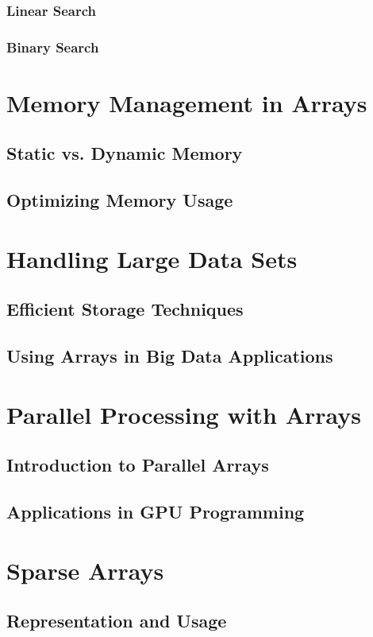 \documentclass[12pt, oneside]{book}
\begin{document}
	\subsubsection{Linear Search}
	\subsubsection{Binary Search}
	
	\section{Memory Management in Arrays}
	\subsection{Static vs. Dynamic Memory}
	\subsection{Optimizing Memory Usage}
	
	\section{Handling Large Data Sets}
	\subsection{Efficient Storage Techniques}
	\subsection{Using Arrays in Big Data Applications}
	
	\section{Parallel Processing with Arrays}
	\subsection{Introduction to Parallel Arrays}
	\subsection{Applications in GPU Programming}
	
	\section{Sparse Arrays}
	\subsection{Representation and Usage}
\end{document}
